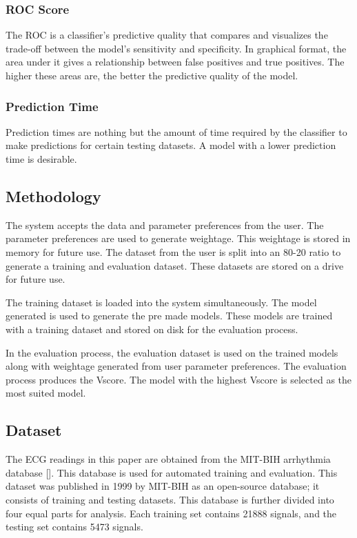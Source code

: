 {\subsubsection{ROC Score}\label{subsubsec:roc_score}
The ROC is a classifier's predictive quality that compares and visualizes the trade-off between the model's sensitivity and specificity. In graphical format, the area under it gives a relationship between false positives and true positives. The higher these areas are, the better the predictive quality of the model.

\subsubsection{Prediction Time}\label{subsubsec:prediction_time}
Prediction times are nothing but the amount of time required by the classifier to make predictions for certain testing datasets. A model with a lower prediction time is desirable.

\subsection{Methodology} \label{subsec:methodology}
The system accepts the data and parameter preferences from the user. The parameter preferences are used to generate weightage. This weightage is stored in memory for future use. The dataset from the user is split into an 80-20 ratio to generate a training and evaluation dataset. These datasets are stored on a drive for future use.

The training dataset is loaded into the system simultaneously. The model generated is used to generate the pre made models. These models are trained with a training dataset and stored on disk for the evaluation process.

In the evaluation process, the evaluation dataset is used on the trained models along with weightage generated from user parameter preferences. The evaluation process produces the Vscore. The model with the highest Vscore is selected as the most suited model.
}

\subsection{Dataset}
The ECG readings in this paper are obtained from the MIT-BIH arrhythmia database []. This database is used for automated training and evaluation. This dataset was published in 1999 by MIT-BIH as an open-source database; it consists of training and testing datasets. This database is further divided into four equal parts for analysis. Each training set contains 21888 signals, and the testing set contains 5473 signals.